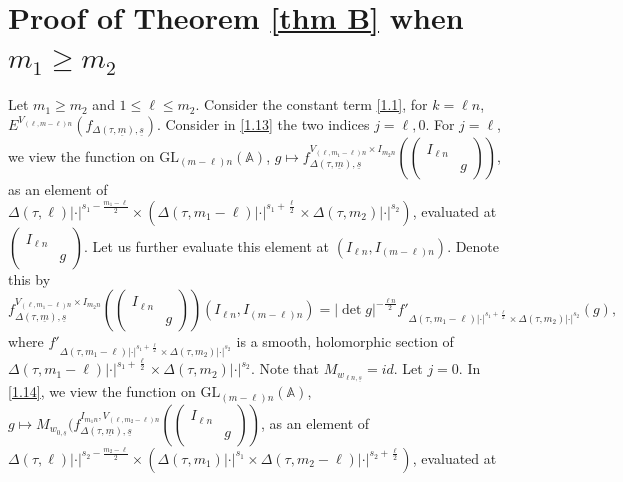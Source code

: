 \documentclass[12pts]{amsart}
\newcommand{\BA}{{\mathbb {A}}}
\newcommand{\GL}{{\mathrm{GL}}}
\begin{document}
\section{Proof of Theorem \ref{thm B} when $m_1\geq m_2$}

Let $m_1\geq m_2$ and $1\leq \ell \leq m_2$. Consider the constant term \eqref{1.1}, for $k=\ell n$, 
 $	E^{V_{(\ell,m-\ell)n}}(f_{\Delta(\tau,\underline{m}),\underline{s}})$. Consider in \eqref{1.13} the two indices $j=\ell,0$. For $j=\ell$, we view the function on
  $\GL_{(m-\ell)n}(\BA)$, $g\mapsto f^{V_{(\ell,m_1-\ell)n}\times I_{m_2n}}_{\Delta(\tau,\underline{m}),\underline{s}}(\begin{pmatrix}I_{\ell n}\\&g\end{pmatrix})$, as an element of
   $\Delta(\tau,\ell)|\cdot|^{s_1-\frac{m_1-\ell}{2}}\times  (\Delta(\tau,m_1-\ell)|\cdot|^{s_1+\frac{\ell}{2}}\times \Delta(\tau,m_2)|\cdot|^{s_2})$, evaluated at 
   $\begin{pmatrix}I_{\ell n}\\&g\end{pmatrix}$. Let us further evaluate this element at $(I_{\ell n}, I_{(m-\ell)n})$. Denote this by
\begin{equation}\label{2.1}
    f^{V_{(\ell,m_1-\ell)n}\times I_{m_2n}}_{\Delta(\tau,\underline{m}),\underline{s}}(\begin{pmatrix}I_{\ell n}\\&g\end{pmatrix})(I_{\ell n},I_{(m-\ell)n})
    =|\det g|^{-\frac{\ell n}{2}}f'_{\Delta(\tau,m_1-\ell)|\cdot|^{s_1+\frac{\ell}{2}}\times \Delta(\tau,m_2)|\cdot|^{s_2}}(g),  
     \end{equation}
     where $f'_{\Delta(\tau,m_1-\ell)|\cdot|^{s_1+\frac{\ell}{2}}\times \Delta(\tau,m_2)|\cdot|^{s_2}}$ is a smooth, holomorphic section of\\
      $\Delta(\tau,m_1-\ell)|\cdot|^{s_1+\frac{\ell}{2}}\times \Delta(\tau,m_2)|\cdot|^{s_2}$. Note that $M_{w_{\ell n,\underline{s}}}=id$.
     Let $j=0$. In \eqref{1.14}, we view the function on $\GL_{(m-\ell)n}(\BA)$,
     $g\mapsto M_{w_{0,\underline{s}}}(f^{I_{m_1 n},V_{(\ell,m_2-\ell)n}}_{\Delta(\tau,\underline{m}),\underline{s}}(\begin{pmatrix}I_{\ell n}\\&g\end{pmatrix})$, as an element of $\Delta(\tau,\ell)|\cdot|^{s_2-\frac{m_2-\ell}{2}}\times  (\Delta(\tau,m_1)|\cdot|^{s_1}\times \Delta(\tau,m_2-\ell)|\cdot|^{s_2+\frac{\ell}{2}})$, evaluated at 
\end{document}
